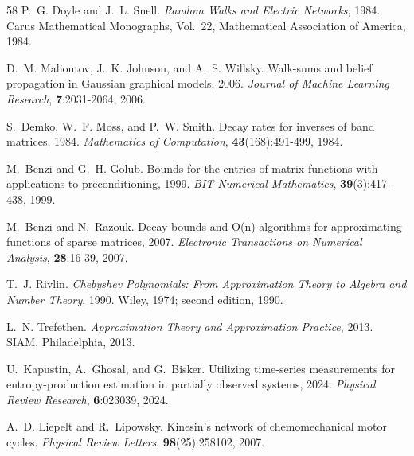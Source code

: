 \documentclass[11pt]{article}
\numberwithin{equation}{section}
\theoremstyle{thmcompact}
\theoremstyle{remark}
\begin{document}
\begin{thebibliography}{58}
{P.~G. Doyle} and {J.~L. Snell}.
\newblock \emph{Random Walks and Electric Networks}, 1984.
\newblock Carus Mathematical Monographs, Vol.~22, Mathematical Association of
  America, 1984.

{D.~M. Malioutov}, {J.~K. Johnson}, and {A.~S. Willsky}.
\newblock Walk-sums and belief propagation in {G}aussian graphical models,
  2006.
\newblock \emph{Journal of Machine Learning Research}, \textbf{7}:2031-2064,
  2006.

{S.~Demko}, {W.~F. Moss}, and {P.~W. Smith}.
\newblock Decay rates for inverses of band matrices, 1984.
\newblock \emph{Mathematics of Computation}, \textbf{43}(168):491-499, 1984.

{M.~Benzi} and {G.~H. Golub}.
\newblock Bounds for the entries of matrix functions with applications to
  preconditioning, 1999.
\newblock \emph{BIT Numerical Mathematics}, \textbf{39}(3):417-438, 1999.

{M.~Benzi} and {N.~Razouk}.
\newblock Decay bounds and {O}(n) algorithms for approximating functions of
  sparse matrices, 2007.
\newblock \emph{Electronic Transactions on Numerical Analysis},
  \textbf{28}:16-39, 2007.

{T.~J. Rivlin}.
\newblock \emph{Chebyshev Polynomials: From Approximation Theory to Algebra and
  Number Theory}, 1990.
\newblock Wiley, 1974; second edition, 1990.

{L.~N. Trefethen}.
\newblock \emph{Approximation Theory and Approximation Practice}, 2013.
\newblock SIAM, Philadelphia, 2013.

{U.~Kapustin}, {A.~Ghosal}, and {G.~Bisker}.
\newblock Utilizing time-series measurements for entropy-production estimation
  in partially observed systems, 2024.
\newblock \emph{Physical Review Research}, \textbf{6}:023039, 2024.

{A.~D. Liepelt} and {R.~Lipowsky}.
\newblock Kinesin's network of chemomechanical motor cycles.
\newblock \emph{Physical Review Letters}, \textbf{98}(25):258102, 2007.


\end{thebibliography}
\end{document}

